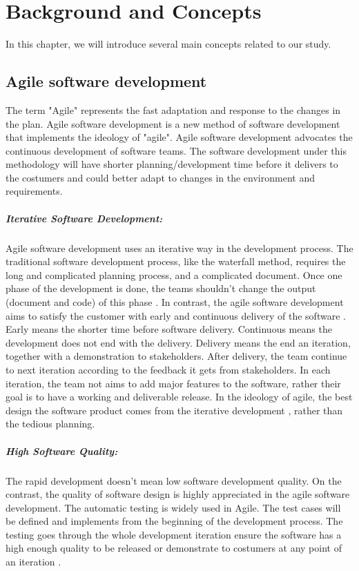\chapter{Background and Concepts}
In this chapter, we will introduce several main concepts related to our study.
\section{Agile software development}
\label{agile}
The term "Agile" represents the fast adaptation and response to the changes in the plan\cite{highsmith2002agile}.
Agile software development is a new method of software development that implements the ideology of "agile". Agile software development advocates the continuous development of software teams. The software development under this methodology will have shorter planning/development time before it delivers to the costumers and could better adapt to changes in the environment and requirements.
\paragraph{Iterative Software Development:} Agile software development uses an iterative way in the development process. The traditional software development process, like the waterfall method, requires the long and complicated planning process, and a complicated document. Once one phase of the development is done, the teams shouldn't change the output (document and code) of this phase \cite{cusumano1995beyond}. In contrast, the agile software development aims to satisfy the customer with early and continuous delivery of the software \cite{beck2001manifesto}. Early means the shorter time before software delivery. Continuous means the development does not end with the delivery. Delivery means the end an iteration, together with a demonstration to stakeholders. After delivery, the team continue to next iteration according to the feedback it gets from stakeholders. In each iteration, the team not aims to add major features to the software, rather their goal \cite{beck1999embracing} is to have a working and deliverable release. In the ideology of agile, the best design the software product comes from the iterative development \cite{beck2001manifesto}, rather than the tedious planning.
\paragraph{High Software Quality:} The rapid development doesn't mean low software development quality. On the contrast, the quality of software design is highly appreciated in the agile software development. The automatic testing is widely used in Agile. The test cases will be defined and implements from the beginning of the development process. The testing goes through the whole development iteration ensure the software has a high enough quality to be released or demonstrate to costumers at any point of an iteration \cite{Agilesof32:online}.
